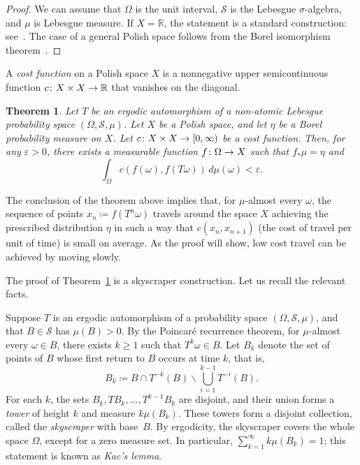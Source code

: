 \documentclass[10pt]{amsart}
\newtheorem{theo}{Theorem}[section]
\theoremstyle{definition}\newtheorem{defi}[theo]{Definition}\newtheorem{rema}[theo]{Remark}\newtheorem{exam}[theo]{Example}\newtheorem{exem}[theo]{Example}\newtheorem{nota}[theo]{Notation}
\newcommand{\R}{\mathbb{R}}
\newcommand{\clS}{\mathcal{S}}
\renewcommand{\epsilon}{\varepsilon}
\renewcommand{\setminus}{\smallsetminus}
\renewcommand*{\to}{\mathchoice{\longrightarrow}{\rightarrow}{\rightarrow}{\rightarrow}}
\newcommand*{\MK}{\mkern 2mu}
\begin{document}
\begin{proof}
We can assume that $\Omega$ is the unit interval, $\clS$ is the Lebesgue $\sigma$-algebra, and $\mu$ is Lebesgue measure. If $X = \R$, the statement is a standard construction: see~\cite[p.~429, Proposition~2$\MK$(2)]{Embrechts}. The case of a general Polish space follows from the Borel isomorphism theorem~\cite[p.~99]{Srivastava}.
\end{proof}


A \emph{cost function} on a Polish space $X$ is a nonnegative upper semicontinuous function $c \colon X \times X \to \R$ that vanishes on the diagonal.

\begin{theo}\label{t.lowcost}
Let $T$ be an ergodic automorphism of a non-atomic Lebesgue probability space $(\Omega,\clS,\mu)$. Let $X$ be a Polish space, and let $\eta$ be a Borel probability measure on $X$. Let $c \colon X \times X \to [0,\infty)$ be a cost function. Then, for any $\epsilon>0$, there exists a measurable function $f \colon \Omega \to X$ such that $f_* \mu = \eta$ and
\begin{equation}\label{e.lowcost}
\int_\Omega c(f(\omega),f(T \omega)) \, d\mu(\omega) < \epsilon.
\end{equation}
\end{theo}

The conclusion of the theorem above implies that, for $\mu$-almost every $\omega$, the sequence of points $x_n \coloneqq f(T^n \omega)$ travels around the space $X$ achieving the prescribed distribution $\eta$ in such a way that $c(x_n,x_{n+1})$ (the cost of travel per unit of time) is small on average. As the proof will show, low cost travel can be achieved by moving slowly.

The proof of Theorem~\ref{t.lowcost} is a skyscraper construction. Let us recall the relevant facts.

Suppose $T$ is an ergodic automorphism of a probability space $(\Omega,\clS,\mu)$, and that $B \in \clS$ has $\mu(B)>0$. By the Poincaré recurrence theorem, for $\mu$-almost every $\omega \in B$, there exists $k \ge 1$ such that $T^k \omega \in B$. Let $B_k$ denote the set of points of $B$ whose first return to $B$ occurs at time $k$, that is,
\begin{equation}\label{e.Bk}
B_k \coloneqq B \cap T^{-k}(B) \setminus \bigcup_{i=1}^{k-1} T^{-i}(B).
\end{equation}
For each $k$, the sets $B_k, TB_k, \dots, T^{k-1} B_k$ are disjoint, and their union forms a \emph{tower} of height $k$ and measure $k \mu(B_k)$. These towers form a disjoint collection, called the \emph{skyscraper} with base~$B$. By ergodicity, the skyscraper covers the whole space $\Omega$, except for a zero measure set. In particular, $\sum_{k=1}^\infty k \mu(B_k) = 1$; this statement is known as \emph{Kac's lemma}.
\end{document}
